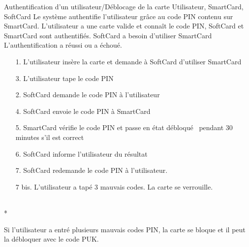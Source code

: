 \documentclass[a4paper,11pt,french]{article}
\begin{document}
\fiche
    {Authentification d'un utilisateur/Déblocage de la carte}
	{Utilisateur, SmartCard, SoftCard}
	{Le système authentifie l'utilisateur grâce au code PIN contenu sur SmartCard.}
	{L'utilisateur a une carte valide et connaît le code PIN, SoftCard et SmartCard sont authentifiés.}
    {SoftCard a besoin d'utiliser SmartCard}
    {L'authentification a réussi ou a échoué.}
    {\begin{itemize}
        \item[]
        \item[1.] L'utilisateur insère la carte et demande à SoftCard 
            d'utiliser SmartCard
        \item[3.] L'utilisateur tape le code PIN
    \end{itemize}
    }
	{\begin{itemize}
        \item[]
		\item[2.] SoftCard demande le code PIN à l'utilisateur
        \item[4.] SoftCard envoie le code PIN à SmartCard
        \item[5.] SmartCard vérifie le code PIN et passe en état 
            \og{}débloqué \fg{} pendant 30 minutes s'il est correct
        \item[6.] SoftCard informe l’utilisateur du résultat
	\end{itemize}
	}
	{}
\flots
{\begin{itemize}
        \item[]
        \item[7.] SoftCard redemande le code PIN à l'utilisateur.
\end{itemize}}
    {\begin{itemize}
    \item[]
    \item[7 bis.] L'utilisateur a tapé 3 mauvais codes. La carte se verrouille.
    \end{itemize}
    }
	{}    
\\*

Si l'utilisateur a entré plusieurs mauvais codes PIN, la carte se bloque et il 
peut la débloquer avec le code PUK.\\
\end{document}
